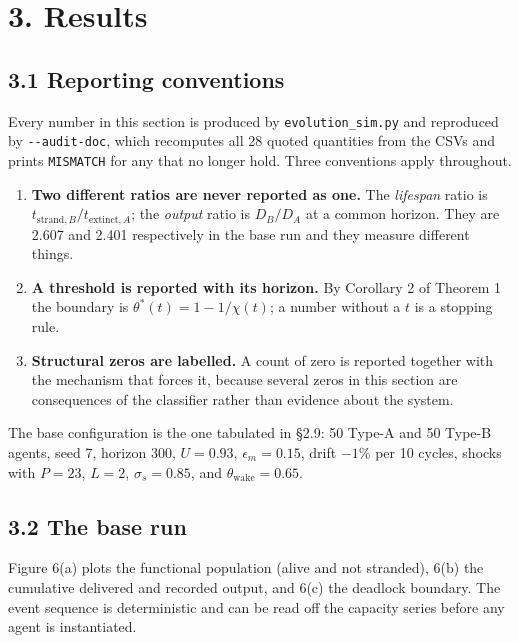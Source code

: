 \documentclass[11pt,a4paper]{article}
\providecommand{\tightlist}{\setlength{\itemsep}{0pt}\setlength{\parskip}{0pt}}
\begin{document}

\section{3. Results}\label{results}

\subsection{3.1 Reporting conventions}\label{reporting-conventions}

Every number in this section is produced by \texttt{evolution\_sim.py} and reproduced by
\texttt{-\/-audit-doc}, which recomputes all 28 quoted quantities from the CSVs and prints
\texttt{MISMATCH} for any that no longer hold. Three conventions apply throughout.

\begin{enumerate}
\def\labelenumi{\arabic{enumi}.}
\tightlist
\item
  \textbf{Two different ratios are never reported as one.} The \emph{lifespan} ratio is
  \(t_{\mathrm{strand},B}/t_{\mathrm{extinct},A}\); the \emph{output} ratio is
  \(D_B/D_A\) at a common horizon. They are 2.607 and 2.401 respectively in the
  base run and they measure different things.
\item
  \textbf{A threshold is reported with its horizon.} By Corollary 2 of Theorem 1 the
  boundary is \(\theta^\ast(t)=1-1/\chi(t)\); a number without a \(t\) is a stopping
  rule.
\item
  \textbf{Structural zeros are labelled.} A count of zero is reported together with
  the mechanism that forces it, because several zeros in this section are
  consequences of the classifier rather than evidence about the system.
\end{enumerate}

The base configuration is the one tabulated in §2.9: 50 Type-A and 50 Type-B
agents, seed 7, horizon 300, \(U=0.93\), \(\epsilon_m=0.15\), drift \(-1\%\) per 10
cycles, shocks with \(P=23\), \(L=2\), \(\sigma_s=0.85\), and \(\theta_{\mathrm{wake}}=0.65\).

\subsection{3.2 The base run}\label{the-base-run}

Figure 6(a) plots the functional population (alive and not stranded), 6(b) the
cumulative delivered and recorded output, and 6(c) the deadlock boundary. The
event sequence is deterministic and can be read off the capacity series before
any agent is instantiated.
\end{document}
